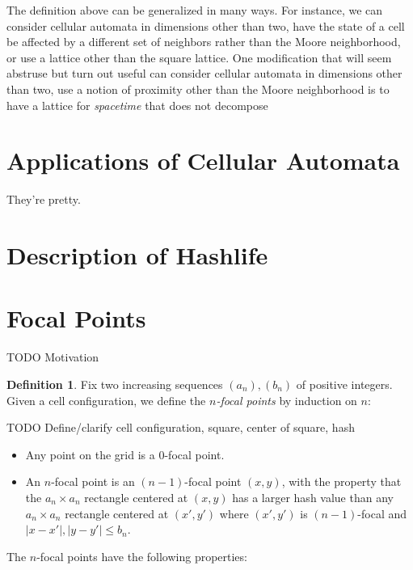 \documentclass{article}
\theoremstyle{definition}
\newtheorem{definition}{Definition}
\begin{document}
The definition above can be generalized in many ways. For instance, we can
consider cellular automata in dimensions other than two, have the state of a
cell be affected by a different set of neighbors rather than the Moore
neighborhood, or use a lattice other than the square lattice. One modification
that will seem abstruse but turn out useful  can consider cellular automata in
dimensions other than two, use a notion of proximity other than the Moore
neighborhood is to have a lattice for \emph {spacetime} that does not decompose 

\section{Applications of Cellular Automata}

They're pretty.

\section{Description of Hashlife}

\section{Focal Points}

TODO Motivation

\begin{definition}
Fix two increasing sequences $(a_n), (b_n)$ of positive integers. Given a cell
configuration, we define the \emph{$n$-focal points} by induction on $n$:

TODO Define/clarify cell configuration, square, center of square, hash

\begin{itemize}
\item Any point on the grid is a $0$-focal point.
\item An $n$-focal point is an $(n-1)$-focal point $(x, y)$, with the property
that the $a_n \times a_n$ rectangle centered at $(x, y)$ has a larger hash value
than any $a_n \times a_n$ rectangle centered at $(x', y')$ where $(x', y')$ is
$(n-1)$-focal and $|x - x'|, |y - y'| \leq b_n$.
\end{itemize}
\end{definition}

The $n$-focal points have the following properties:
\end{document}
